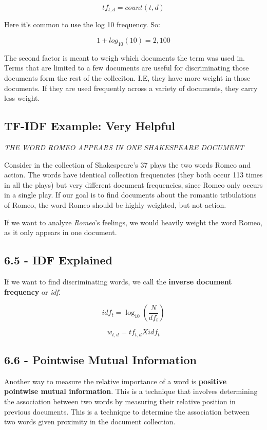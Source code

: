 \documentclass{article}
\begin{document}
\[
    tf_{t,d} = count(t,d)
\]

Here it's common to use the log 10 frequency. So:


\[
    1 + log_{10}(10) = 2,100
\]

The second factor is meant to weigh which documents the term was used in. Terms that are limited to a few documents are useful for
discriminating those documents form the rest of the colleciton. I.E, they have more weight in those documents. If they are used frequently across
a variety of documents, they carry less weight.

\subsection{TF-IDF Example: Very Helpful}

\textit{THE WORD ROMEO APPEARS IN ONE SHAKESPEARE DOCUMENT} \newline

Consider in the collection of Shakespeare’s 37 plays the two words Romeo and action. The words
have identical collection frequencies (they both occur 113 times in all the plays) but
very different document frequencies, since Romeo only occurs in a single play. If
our goal is to find documents about the romantic tribulations of Romeo, the word
Romeo should be highly weighted, but not action. \newline

If we want to analyze \textit{Romeo}'s feelings, we would heavily weight the word Romeo, as it only appears in one document.

\subsection{6.5 - IDF Explained}

If we want to find discriminating words, we call the \textbf{inverse document frequency} or \textit{idf}.

\[
    idf_t = \log_{10}(\frac{N}{df_t})
\]

\[
    w_{t,d} = tf_{t,d} X idf_{t}
\]

\subsection{6.6 - Pointwise Mutual Information}

Another way to measure the relative importance of a word is \textbf{positive pointwise mutual information}. This is a technique that involves
determining the association between two words by measuring their relative position in previous documents.
This is a technique to determine the association between two words given proximity in the document collection.
\end{document}
